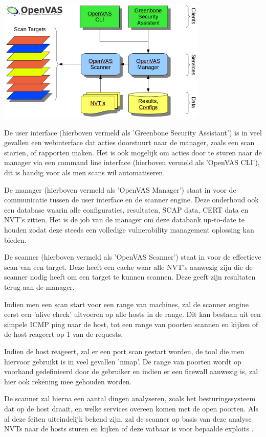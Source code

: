  
\includegraphics[width=10.0cm]{img/Openvas-structuur.png} \textcite{Openvas-about}
 
De user interface (hierboven vermeld als 'Greenbone Security Assistant') is in veel gevallen een webinterface dat acties doorstuurt naar de manager, zoals een scan starten, of rapporten maken. Het is ook mogelijk om acties door te sturen naar de manager via een command line interface (hierboven vermeld als 'OpenVAS CLI'), dit is handig voor als men scans wil automatiseren.

De manager (hierboven vermeld als 'OpenVAS Manager') staat in voor de communicatie tussen de user interface en de scanner engine. Deze onderhoud ook een database waarin alle configuraties, resultaten, SCAP data, CERT data en NVT's zitten. Het is de job van de manager om deze databank up-to-date te houden zodat deze steeds een volledige vulnerability management oplossing kan bieden.

De scanner (hierboven vermeld als 'OpenVAS Scanner') staat in voor de effectieve scan van een target. Deze heeft een cache waar alle NVT's aanwezig zijn die de scanner nodig heeft om een target te kunnen scannen. Deze geeft zijn resultaten terug aan de manager. 

Indien men een scan start voor een range van machines, zal de scanner engine eerst een 'alive check' uitvoeren op alle hosts in de range. Dit kan bestaan uit een simpele ICMP ping naar de host, tot een range van poorten scannen en kijken of de host reageert op 1 van de requests. 

Indien de host reageert, zal er een port scan gestart worden, de tool die men hiervoor gebruikt is in veel gevallen 'nmap'. De range van poorten wordt op voorhand gedefinieerd door de gebruiker en indien er een firewall aanwezig is, zal hier ook rekening mee gehouden worden. 

De scanner zal hierna een aantal dingen analyseren, zoals het besturingssysteem dat op de host draait, en welke services overeen komen met de open poorten. Als al deze feiten uiteindelijk bekend zijn, zal de scanner op basis van deze analyse NVTs naar de hosts sturen en kijken of deze vatbaar is voor bepaalde exploits \textcite{Qualys}.


